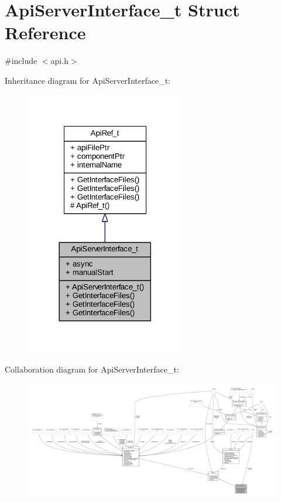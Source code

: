 \hypertarget{struct_api_server_interface__t}{}\section{Api\+Server\+Interface\+\_\+t Struct Reference}
\label{struct_api_server_interface__t}


{\ttfamily \#include $<$api.\+h$>$}



Inheritance diagram for Api\+Server\+Interface\+\_\+t\+:
\nopagebreak
\begin{figure}[H]
\begin{center}
\leavevmode
\includegraphics[width=197pt]{struct_api_server_interface__t__inherit__graph}
\end{center}
\end{figure}


Collaboration diagram for Api\+Server\+Interface\+\_\+t\+:
\nopagebreak
\begin{figure}[H]
\begin{center}
\leavevmode
\includegraphics[width=350pt]{struct_api_server_interface__t__coll__graph}
\end{center}
\end{figure}
